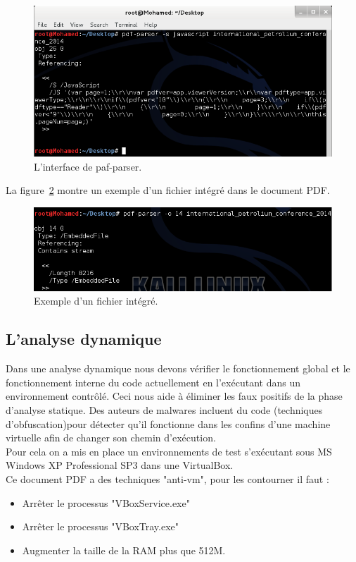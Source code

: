 \begin{figure}[H]
\begin{center}
\includegraphics[scale=0.6]{Figures/anal5.png}
\caption{L'interface de paf-parser.}
\label{fig :anal5} 
\end{center}
\end{figure}
La figure~\ref{fig :anal6} montre un exemple d'un fichier intégré dans le document PDF.
\begin{figure}[H]
\begin{center}
\includegraphics[scale=0.7]{Figures/anal6.png}
\caption{Exemple d'un fichier intégré.}
\label{fig :anal6} 
\end{center}
\end{figure}
\subsection{L'analyse dynamique}
Dans une analyse dynamique nous devons vérifier le fonctionnement global et le fonctionnement interne du code actuellement en l'exécutant dans un environnement contrôlé.  Ceci nous aide à éliminer les faux positifs de la phase d'analyse statique. Des auteurs de malwares incluent du code (techniques d'obfuscation)pour détecter qu'il fonctionne dans les confins d'une machine virtuelle afin de changer son chemin d'exécution.\\

Pour cela on a mis en place un environnements de test s'exécutant
sous MS Windows XP Professional SP3 dans une VirtualBox.\\
Ce document PDF a des techniques "anti-vm", pour les contourner il faut :
\begin{itemize}
\item Arrêter le processus "VBoxService.exe" 
\item Arrêter le processus "VBoxTray.exe"
\item Augmenter la taille de la RAM plus que 512M.
\end{itemize} 
